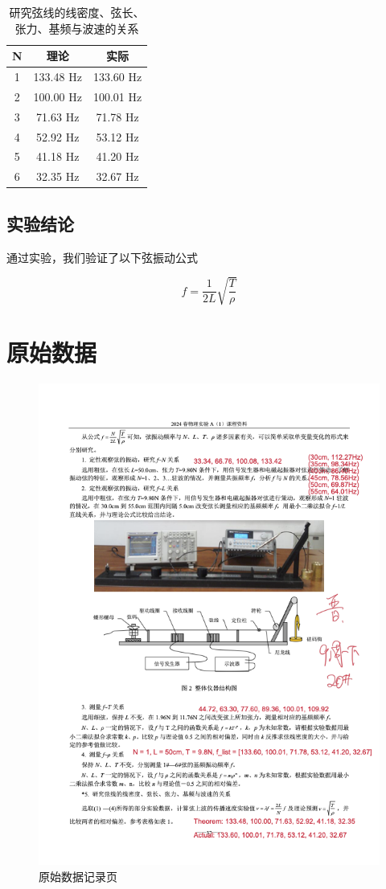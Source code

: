 \documentclass[12pt,a4paper]{amsart}
\begin{document}
\begin{table}[H]
    \centering
    \caption{研究弦线的线密度、弦长、张力、基频与波速的关系}
    \begin{tabular}{ccc}
        \toprule
        N & 理论 & 实际 \\
        \midrule
        1 & 133.48 Hz & 133.60 Hz \\
        2 & 100.00 Hz & 100.01 Hz \\
        3 & 71.63 Hz & 71.78 Hz \\
        4 & 52.92 Hz & 53.12 Hz \\
        5 & 41.18 Hz & 41.20 Hz \\
        6 & 32.35 Hz & 32.67 Hz \\
        \bottomrule
    \end{tabular}
    \label{chart}
\end{table}

\subsection{实验结论}

通过实验，我们验证了以下弦振动公式

\begin{equation}
    f = \frac{1}{2L} \sqrt{\frac{T}{\rho}}
\end{equation}

\section{原始数据}

\begin{figure}[h]
	\centering
	\includegraphics[width=1.0\textwidth]{img/original_data.png}
	\caption{原始数据记录页}
	\label{fig:original_data_page_1}
\end{figure}
\end{document}
